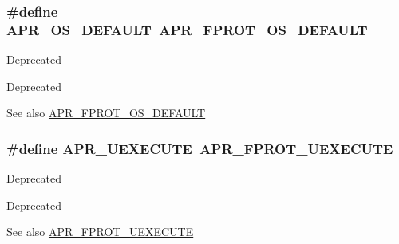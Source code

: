 \subsubsection[{\texorpdfstring{A\+P\+R\+\_\+\+O\+S\+\_\+\+D\+E\+F\+A\+U\+LT}{APR_OS_DEFAULT}}]{\setlength{\rightskip}{0pt plus 5cm}\#define A\+P\+R\+\_\+\+O\+S\+\_\+\+D\+E\+F\+A\+U\+LT~{\bf A\+P\+R\+\_\+\+F\+P\+R\+O\+T\+\_\+\+O\+S\+\_\+\+D\+E\+F\+A\+U\+LT}}\hypertarget{group__apr__file__permissions_ga8552adb50d545d5fc7faeabb4f4a388f}{}\label{group__apr__file__permissions_ga8552adb50d545d5fc7faeabb4f4a388f}
\begin{DoxyRefDesc}{Deprecated}
\item[\hyperlink{deprecated__deprecated000022}{Deprecated}]\end{DoxyRefDesc}
\begin{DoxySeeAlso}{See also}
\hyperlink{group__apr__file__permissions_gad3c65a67ee6eb12ecc6a33857397900b}{A\+P\+R\+\_\+\+F\+P\+R\+O\+T\+\_\+\+O\+S\+\_\+\+D\+E\+F\+A\+U\+LT} 
\end{DoxySeeAlso}
\subsubsection[{\texorpdfstring{A\+P\+R\+\_\+\+U\+E\+X\+E\+C\+U\+TE}{APR_UEXECUTE}}]{\setlength{\rightskip}{0pt plus 5cm}\#define A\+P\+R\+\_\+\+U\+E\+X\+E\+C\+U\+TE~{\bf A\+P\+R\+\_\+\+F\+P\+R\+O\+T\+\_\+\+U\+E\+X\+E\+C\+U\+TE}}\hypertarget{group__apr__file__permissions_ga4c08d7e798ab4022e31ed70f06f202b5}{}\label{group__apr__file__permissions_ga4c08d7e798ab4022e31ed70f06f202b5}
\begin{DoxyRefDesc}{Deprecated}
\item[\hyperlink{deprecated__deprecated000013}{Deprecated}]\end{DoxyRefDesc}
\begin{DoxySeeAlso}{See also}
\hyperlink{group__apr__file__permissions_ga156e1374a4ef30e745340d8c20b36d03}{A\+P\+R\+\_\+\+F\+P\+R\+O\+T\+\_\+\+U\+E\+X\+E\+C\+U\+TE} 
\end{DoxySeeAlso}

